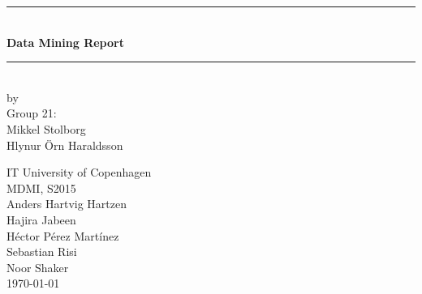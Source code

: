 \documentclass[a4paper,11pt]{article}
\begin{document}
\begin{titlepage}

\centering \parindent=0pt
\newcommand{\HRule}{\rule{\textwidth}{1mm}}
 \HRule\\[1cm]\Huge\bfseries
Data Mining Report\\[0.7cm]
\HRule\\[4cm]  
\large by 
\\ Group 21:
\\ Mikkel Stolborg
\\ Hlynur Örn Haraldsson
 \normalsize %
\begin{flushleft}
IT University of Copenhagen \\
MDMI, S2015\\
Anders Hartvig Hartzen\\
Hajira Jabeen\\
Héctor Pérez Martínez\\
Sebastian Risi\\
Noor Shaker\\
\today 
\end{flushleft}
\end{titlepage}

\tableofcontents
\pagebreak



\end{document}

